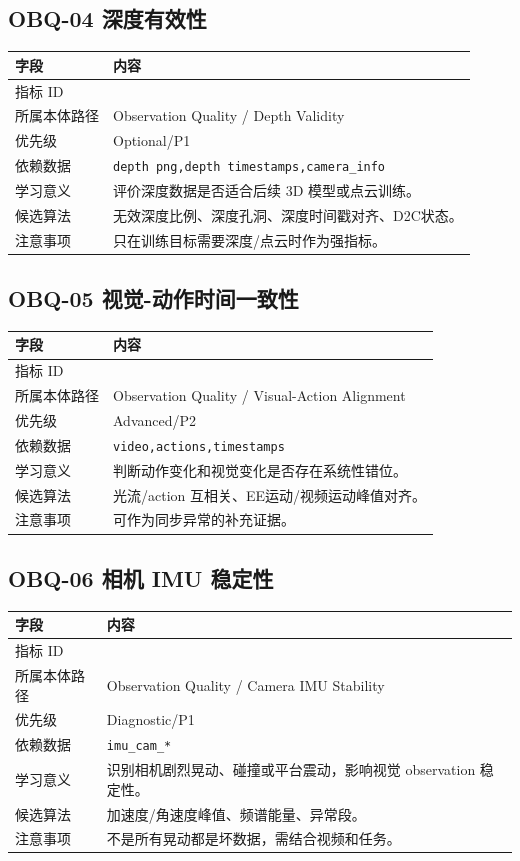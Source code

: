 \documentclass[UTF8,zihao=-4,oneside,openany]{ctexrep}
\newcommand{\Code}[1]{\texttt{#1}}
\newcommand{\MID}[1]{\texttt{\seqsplit{#1}}}
\begin{document}
\subsection{OBQ-04 深度有效性}

\begin{longtable}{L{3.6cm} L{9.6cm}}
\toprule
字段 & 内容 \\
\midrule
指标 ID & \MID{OBQ-04} \\
所属本体路径 & Observation Quality / Depth Validity \\
优先级 & Optional/P1 \\
依赖数据 & \Code{depth png,depth timestamps,camera\_info} \\
学习意义 & 评价深度数据是否适合后续 3D 模型或点云训练。 \\
候选算法 & 无效深度比例、深度孔洞、深度时间戳对齐、D2C状态。 \\
注意事项 & 只在训练目标需要深度/点云时作为强指标。 \\
\bottomrule
\end{longtable}

\subsection{OBQ-05 视觉-动作时间一致性}

\begin{longtable}{L{3.6cm} L{9.6cm}}
\toprule
字段 & 内容 \\
\midrule
指标 ID & \MID{OBQ-05} \\
所属本体路径 & Observation Quality / Visual-Action Alignment \\
优先级 & Advanced/P2 \\
依赖数据 & \Code{video,actions,timestamps} \\
学习意义 & 判断动作变化和视觉变化是否存在系统性错位。 \\
候选算法 & 光流/action 互相关、EE运动/视频运动峰值对齐。 \\
注意事项 & 可作为同步异常的补充证据。 \\
\bottomrule
\end{longtable}

\subsection{OBQ-06 相机 IMU 稳定性}

\begin{longtable}{L{3.6cm} L{9.6cm}}
\toprule
字段 & 内容 \\
\midrule
指标 ID & \MID{OBQ-06} \\
所属本体路径 & Observation Quality / Camera IMU Stability \\
优先级 & Diagnostic/P1 \\
依赖数据 & \Code{imu\_cam\_*} \\
学习意义 & 识别相机剧烈晃动、碰撞或平台震动，影响视觉 observation 稳定性。 \\
候选算法 & 加速度/角速度峰值、频谱能量、异常段。 \\
注意事项 & 不是所有晃动都是坏数据，需结合视频和任务。 \\
\bottomrule
\end{longtable}
\end{document}
